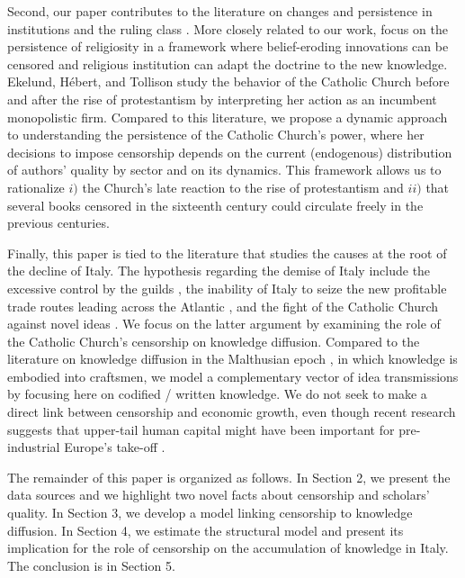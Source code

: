\documentclass[12pt]{article}
\begin{document}
Second, our paper contributes to the literature on changes and persistence in institutions and the ruling class \cite{acemoglu2001,acemoglu2008,acemoglu2008b}. More closely related to our work,  focus on the persistence of religiosity in a framework where belief-eroding innovations can be censored and religious institution can adapt the doctrine to the new knowledge. Ekelund, Hébert, and Tollison \citeyear{ekelund2002,ekelund2004} study the behavior of the Catholic Church before and after the rise of protestantism by interpreting her action as an incumbent monopolistic firm. Compared to this literature, we propose a dynamic approach to understanding the persistence of the Catholic Church's power, where her decisions to impose censorship depends on the current (endogenous) distribution of authors' quality by sector and on its dynamics. This framework allows us to rationalize  $i)$ the Church's late reaction to the rise of protestantism and $ii)$ that several books censored in the sixteenth century could circulate freely in the previous centuries.

Finally, this paper is tied to the literature that studies the causes at the root of the decline of Italy. The hypothesis regarding the demise of Italy include the excessive control by the guilds \cite{cipolla2004}, the inability of Italy to seize the new profitable trade routes leading across the Atlantic \cite{land99,braudel2018}, and the fight of the Catholic Church against novel ideas \cite{land99,gusdorf1971}. We focus on the latter argument by examining the role of the Catholic Church's censorship on knowledge diffusion. Compared to the literature on knowledge diffusion in the Malthusian epoch \cite{de2017clans}, in which knowledge is embodied into craftsmen, we model a complementary vector of idea transmissions by focusing here on codified / written knowledge. We do not seek to make a direct link between censorship and economic growth, even though recent research suggests that upper-tail human capital might have been important for pre-industrial Europe’s take-off \cite{squicciarini2015,cantoni2014,mokyr2012,mokyr2016}. 

The remainder of this paper is organized as follows.  In Section 2, we present the data sources and we highlight two novel facts about censorship and scholars' quality. In Section 3, we develop a model linking censorship to knowledge diffusion.  In Section 4, we estimate the structural model and present its implication for the role of censorship on the accumulation of knowledge in Italy. The conclusion is in Section 5.
\end{document}
